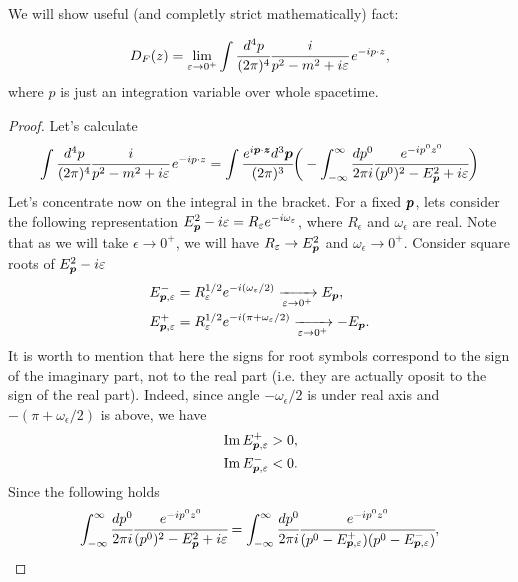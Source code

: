 \documentclass[main.tex]{subfiles}
\begin{document}
We will show useful (and completly strict mathematically) fact:
\begin{fact}
\begin{equation}
D_F(z) = \lim_{\epsilon\to 0^+}\int \cfrac{d^4 p}{(2\pi)^4} \cfrac{i}{p^2 - m^2 + i\epsilon}\, e^{-ip\cdot z}, 
\end{equation}
where $p$ is just an integration variable over whole spacetime.
\end{fact}
\begin{proof}
Let's calculate
\begin{align}
\label{faynman-propagator-big-integral}
\int \cfrac{d^4 p}{(2\pi)^4} \cfrac{i}{p^2 - m^2 + i\epsilon}\, e^{-ip\cdot z}
= \int \cfrac{e^{i\bs{p}\cdot\bs{z}}d^3 \bs{p}}{(2\pi)^3}
\bigg(-\int_{-\infty}^\infty \cfrac{dp^0}{2\pi i} \cfrac{e^{-ip^0z^0}}{(p^0)^2 - E^2_{\bs{p}} + i\epsilon}\bigg)
\end{align}
Let's concentrate now on the integral in the bracket.
For a fixed $\bs{p}$, lets consider the following representation $E^2_{\bs{p}} - i\epsilon = R_\epsilon e^{-i \omega_\epsilon}$, where $R_\epsilon$ and $\omega_\epsilon$ are real. Note that as we will take $\epsilon \to 0^+$, we will have $R_\epsilon\to E^2_{\bs{p}}$ and $\omega_\epsilon \to 0^+$. Consider square roots of $E^2_{\bs{p}} - i\epsilon$
\begin{align}
& E^{-}_{\bs{p}, \epsilon} = R^{1/2}_\epsilon e^{-i (\omega_\epsilon/2)} \xrightarrow[\epsilon \to 0^+]{} E_{\bs{p}},\\
& E^{+}_{\bs{p}, \epsilon} = R^{1/2}_\epsilon e^{-i (\pi + \omega_\epsilon/2)}
\xrightarrow[\epsilon \to 0^+]{} - E_{\bs{p}}.
\end{align}
It is worth to mention that here the signs for root symbols correspond to the sign of the imaginary part, not to the real part (i.e. they are actually oposit to the sign of the real part). Indeed, since angle $-\omega_\epsilon/2$ is under real axis and $-(\pi + \omega_\epsilon/2)$ is above, we have
\begin{align}
& \Im E^{+}_{\bs{p}, \epsilon} > 0, \\
& \Im E^{-}_{\bs{p},  \epsilon} < 0.
\end{align}
Since the following holds
\begin{equation}
\label{faynman-propagator-small-integral}
\int_{-\infty}^\infty \cfrac{dp^0}{2\pi i} \cfrac{e^{-ip^0z^0}}{(p^0)^2 - E^2_{\bs{p}} + i\epsilon}
= \int_{-\infty}^\infty \cfrac{dp^0}{2\pi i} \cfrac{e^{-ip^0z^0}}{(p^0 - E^{+}_{\bs{p}, \epsilon})(p^0 - E^{-}_{\bs{p}, \epsilon})},
\end{equation}

\end{proof}
\end{document}
